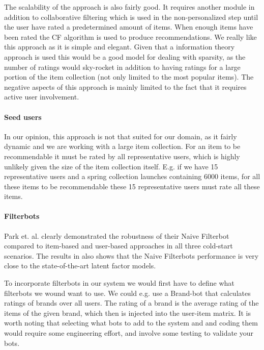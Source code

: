 The scalability of the approach is also fairly good. It requires another module
in addition to collaborative filtering which is used in the non-personalized
step until the user have rated a predetermined amount of items. When enough
items have been rated the CF algorithm is used to produce recommendations. We
really like this approach as it is simple and elegant. Given that a information
theory approach is used this would be a good model for dealing with sparsity,
as the number of ratings would sky-rocket in addition to having ratings for a
large portion of the item collection (not only limited to the most popular
items). The negative aspects of this approach is mainly limited to the fact
that it requires active user involvement.\newline

\paragraph{Seed users}

In our opinion, this approach is not that suited for our domain, as it fairly
dynamic and we are working with a large item collection. For an item to be
recommendable it must be rated by all representative users, which is highly
unlikely given the size of the item collection itself. E.g. if we have 15
representative users and a spring collection launches containing 6000 items,
for all these items to be recommendable these 15 representative users must rate
all these items.

\paragraph{Filterbots}

Park et. al. \cite{Park2006} clearly demonstrated the robustness of their Naive
Filterbot compared to item-based and user-based approaches in all three
cold-start scenarios. The results in \cite{Agarwal2009, Agarwal2010} also shows
that the Naive Filterbots performance is very close to the state-of-the-art
latent factor models.

To incorporate filterbots in our system we would first have to define what
filterbots we wound want to use. We could e.g. use a Brand-bot that calculates
ratings of brands over all users. The rating of a brand is the average rating
of the items of the given brand, which then is injected into the user-item
matrix. It is worth noting that selecting what bots to add to the system and
and coding them would require some engineering effort, and involve some testing
to validate your bots.

